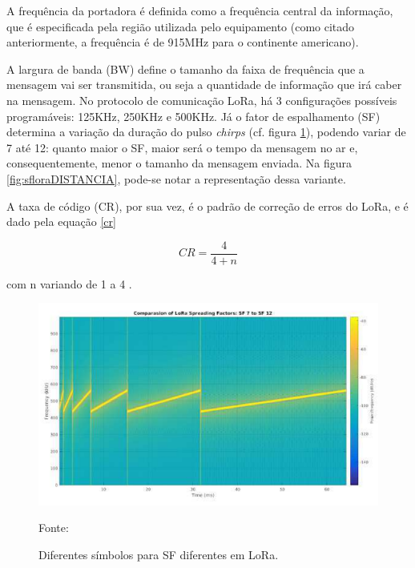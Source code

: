 \par A frequência da portadora é definida como a frequência central da informação, que é especificada pela região utilizada pelo equipamento (como citado anteriormente, a frequência é de 915MHz para o continente americano).

\par A largura de banda (BW) define o tamanho da faixa de frequência que a mensagem vai ser transmitida, ou seja a quantidade de informação que irá caber na mensagem. No protocolo de comunicação LoRa, há 3 configurações possíveis programáveis:  125KHz, 250KHz e 500KHz. Já o fator de espalhamento (SF) determina a variação da duração do pulso \textit{chirps} (cf. figura \ref{fig:sflora}), podendo variar de 7 até 12: quanto maior o SF, maior será o tempo da mensagem no ar e, consequentemente, menor o tamanho da mensagem enviada. Na figura \ref{fig:sfloraDISTANCIA}, pode-se notar a representação dessa variante.
\par A taxa de código (CR), por sua vez, é o padrão de correção de erros do LoRa, e é dado pela equação \ref{cr}

\begin{center}
\begin{equation}
\label{cr}
    CR=\frac{4}{4+n}    
\end{equation}
\end{center}
com n variando de 1 a 4 \cite{aplicacaolora}.
\begin{figure}[H]
  \centering
  \includegraphics[scale=0.7]{figuras/sflora.png}
  \caption{Diferentes símbolos para SF diferentes em LoRa. }
 { \footnotesize Fonte:\cite{lorasf1}} 
  \label{fig:sflora}
\end{figure}

